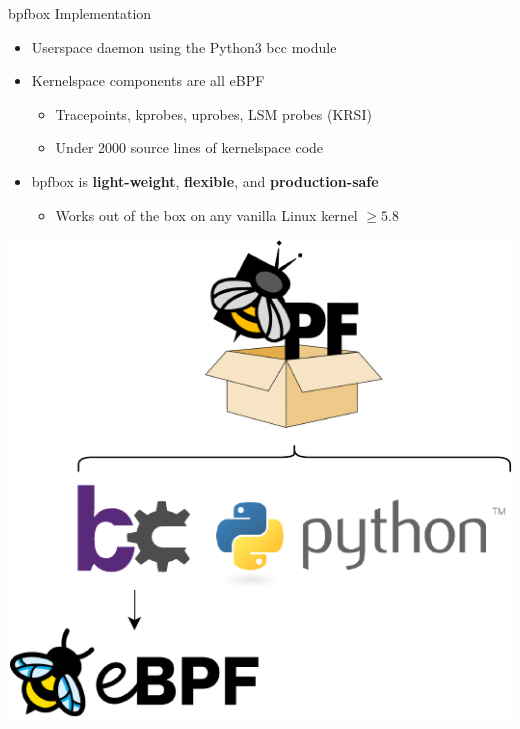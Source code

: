 \documentclass[12pt, dvipsnames]{beamer}
\begin{document}


\begin{frame}[c]{bpfbox Implementation}
\begin{itemize}
    \item Userspace daemon using the Python3 bcc module
    \vfill
    \item Kernelspace components are all eBPF
    \begin{itemize}
        \item Tracepoints, kprobes, uprobes, LSM probes (KRSI)
        \item Under 2000 source lines of kernelspace code
    \end{itemize}
    \vfill
    \item bpfbox is \textbf{light-weight}, \textbf{flexible}, and \textbf{production-safe}
    \begin{itemize}
        \item Works out of the box on any vanilla Linux kernel $\ge 5.8$
    \end{itemize}
\end{itemize}
\begin{center}
    \color{black}
    \includegraphics[height=0.33\textheight]{figs/at-a-glance.pdf}
\end{center}
\end{frame}
\end{document}
